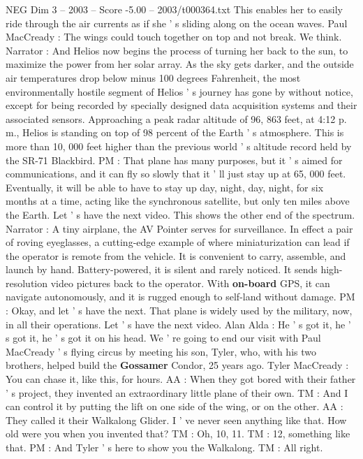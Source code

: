 \begin{textsample}{NEG Dim 3 – 2003 – Score -5.00 – 2003/t000364.txt}
This enables her to easily ride through the air currents as if she ' s sliding along on the ocean waves.
Paul MacCready : The wings could touch together on top and not break.
We think.
Narrator : And Helios now begins the process of turning her back to the sun, to maximize the power from her solar array.
As the sky gets darker, and the outside air temperatures drop below minus 100 degrees Fahrenheit, the most environmentally hostile segment of Helios ' s journey has gone by without notice, except for being recorded by specially designed data acquisition systems and their associated sensors.
Approaching a peak radar altitude of 96, 863 feet, at 4:12 p. m., Helios is standing on top of 98 percent of the Earth ' s atmosphere.
This is more than 10, 000 feet higher than the previous world ' s altitude record held by the SR-71 Blackbird.
PM : That plane has many purposes, but it ' s aimed for communications, and it can fly so slowly that it ' ll just stay up at 65, 000 feet.
Eventually, it will be able to have to stay up day, night, day, night, for six months at a time, acting like the synchronous satellite, but only ten miles above the Earth.
Let ' s have the next video.
This shows the other end of the spectrum.
Narrator : A tiny airplane, the AV Pointer serves for surveillance.
In effect a pair of roving eyeglasses, a cutting-edge example of where miniaturization can lead if the operator is remote from the vehicle.
It is convenient to carry, assemble, and launch by hand.
Battery-powered, it is silent and rarely noticed.
It sends high-resolution video pictures back to the operator.
With \textbf{on-board} GPS, it can navigate autonomously, and it is rugged enough to self-land without damage.
PM : Okay, and let ' s have the next.
That plane is widely used by the military, now, in all their operations.
Let ' s have the next video.
Alan Alda : He ' s got it, he ' s got it, he ' s got it on his head.
We ' re going to end our visit with Paul MacCready ' s flying circus by meeting his son, Tyler, who, with his two brothers, helped build the \textbf{Gossamer} Condor, 25 years ago.
Tyler MacCready : You can chase it, like this, for hours.
AA : When they got bored with their father ' s project, they invented an extraordinary little plane of their own.
TM : And I can control it by putting the lift on one side of the wing, or on the other.
AA : They called it their Walkalong Glider.
I ' ve never seen anything like that.
How old were you when you invented that?
TM : Oh, 10, 11.
TM : 12, something like that.
PM : And Tyler ' s here to show you the Walkalong.
TM : All right.

\end{textsample}
